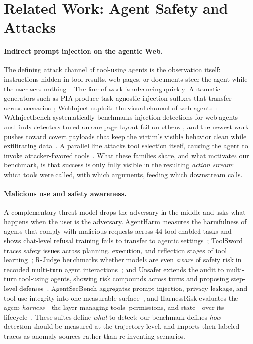 \section{Related Work: Agent Safety and Attacks}
\label{sec:related}

\paragraph{Indirect prompt injection on the agentic Web.} The defining attack channel of tool-using agents is the observation itself: instructions hidden in tool results, web pages, or documents steer the agent while the user sees nothing~\cite{wang2026landscape}. The line of work is advancing quickly. Automatic generators such as PIA produce task-agnostic injection suffixes that transfer across scenarios~\cite{liu2024automatic}; WebInject exploits the visual channel of web agents~\cite{wang2025webinject}; WAInjectBench systematically benchmarks injection detections for web agents and finds detectors tuned on one page layout fail on others~\cite{liu2025wainjectbench}; and the newest work pushes toward covert payloads that keep the victim's visible behavior clean while exfiltrating data~\cite{lee2026will}. A parallel line attacks tool selection itself, causing the agent to invoke attacker-favored tools~\cite{shi2025prompt}. What these families share, and what motivates our benchmark, is that success is only fully visible in the resulting \emph{action stream}: which tools were called, with which arguments, feeding which downstream calls.

\paragraph{Malicious use and safety awareness.} A complementary threat model drops the adversary-in-the-middle and asks what happens when the user is the adversary. AgentHarm measures the harmfulness of agents that comply with malicious requests across 44 tool-enabled tasks and shows chat-level refusal training fails to transfer to agentic settings~\cite{andriushchenko2024agentharm}; ToolSword traces safety issues across planning, execution, and reflection stages of tool learning~\cite{ye2024toolsword}; R-Judge benchmarks whether models are even \emph{aware} of safety risk in recorded multi-turn agent interactions~\cite{yuan2024rjudge}; and Unsafer extends the audit to multi-turn tool-using agents, showing risk compounds across turns and proposing step-level defenses~\cite{li2026unsafer}. AgentSecBench aggregates prompt injection, privacy leakage, and tool-use integrity into one measurable surface~\cite{alpay2026agentsecbench}, and HarnessRisk evaluates the agent \emph{harness}---the layer managing tools, permissions, and state---over its lifecycle~\cite{bai2026harnessrisk}. These suites define \emph{what} to detect; our benchmark defines \emph{how} detection should be measured at the trajectory level, and imports their labeled traces as anomaly sources rather than re-inventing scenarios.

